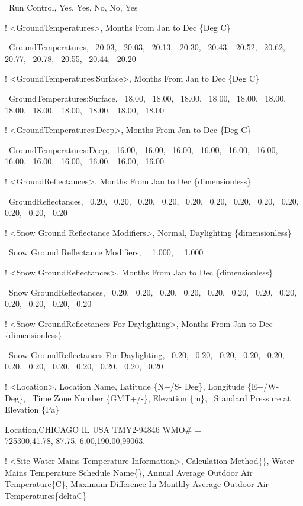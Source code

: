 ~Run Control, Yes, Yes, No, No, Yes

! \textless{}GroundTemperatures\textgreater{}, Months From Jan to Dec \{Deg C\}

~GroundTemperatures,~ 20.03,~ 20.03,~ 20.13,~ 20.30,~ 20.43,~ 20.52,~ 20.62,~ 20.77,~ 20.78,~ 20.55,~ 20.44,~ 20.20

! \textless{}GroundTemperatures:Surface\textgreater{}, Months From Jan to Dec \{Deg C\}

~GroundTemperatures:Surface,~ 18.00,~ 18.00,~ 18.00,~ 18.00,~ 18.00,~ 18.00,~ 18.00,~ 18.00,~ 18.00,~ 18.00,~ 18.00,~ 18.00

! \textless{}GroundTemperatures:Deep\textgreater{}, Months From Jan to Dec \{Deg C\}

~GroundTemperatures:Deep,~ 16.00,~ 16.00,~ 16.00,~ 16.00,~ 16.00,~ 16.00,~ 16.00,~ 16.00,~ 16.00,~ 16.00,~ 16.00,~ 16.00

! \textless{}GroundReflectances\textgreater{}, Months From Jan to Dec \{dimensionless\}

~GroundReflectances,~ 0.20,~ 0.20,~ 0.20,~ 0.20,~ 0.20,~ 0.20,~ 0.20,~ 0.20,~ 0.20,~ 0.20,~ 0.20,~ 0.20

! \textless{}Snow Ground Reflectance Modifiers\textgreater{}, Normal, Daylighting \{dimensionless\}

~Snow Ground Reflectance Modifiers,~~ 1.000,~~ 1.000

! \textless{}Snow GroundReflectances\textgreater{}, Months From Jan to Dec \{dimensionless\}

~Snow GroundReflectances,~ 0.20,~ 0.20,~ 0.20,~ 0.20,~ 0.20,~ 0.20,~ 0.20,~ 0.20,~ 0.20,~ 0.20,~ 0.20,~ 0.20

! \textless{}Snow GroundReflectances For Daylighting\textgreater{}, Months From Jan to Dec \{dimensionless\}

~Snow GroundReflectances For Daylighting,~ 0.20,~ 0.20,~ 0.20,~ 0.20,~ 0.20,~ 0.20,~ 0.20,~ 0.20,~ 0.20,~ 0.20,~ 0.20,~ 0.20

! \textless{}Location\textgreater{}, Location Name, Latitude \{N+/S- Deg\}, Longitude \{E+/W- Deg\},~ Time Zone Number \{GMT+/-\}, Elevation \{m\},~ Standard Pressure at Elevation \{Pa\}

Location,CHICAGO IL USA TMY2-94846 WMO\# = 725300,41.78,-87.75,-6.00,190.00,99063.

! \textless{}Site Water Mains Temperature Information\textgreater{}, Calculation Method\{\}, Water Mains Temperature Schedule Name\{\}, Annual Average Outdoor Air Temperature\{C\}, Maximum Difference In Monthly Average Outdoor Air Temperatures\{deltaC\}

